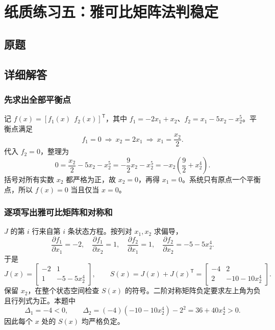 \chapter{纸质练习五：雅可比矩阵法判稳定}

\section{原题}



\section{详细解答}

\subsection{先求出全部平衡点}

记 $f(x)=[f_1(x)\ \ f_2(x)]^{\mathsf T}$，其中
$f_1=-2x_1+x_2$、$f_2=x_1-5x_2-x_2^5$。平衡点满足
\[
    f_1=0 \ \Longrightarrow\ x_2=2x_1 \ \Longrightarrow\ x_1=\frac{x_2}{2}.
\]
代入 $f_2=0$，整理为
\[
    0=\frac{x_2}{2}-5x_2-x_2^5
      =-\frac92 x_2-x_2^5
      =-x_2\left(\frac92+x_2^4\right).
\]
括号对所有实数 $x_2$ 都严格为正，故 $x_2=0$，再得 $x_1=0$。系统只有原点一个平衡点，所以 $f(x)=0$ 当且仅当 $x=0$。

\subsection{逐项写出雅可比矩阵和对称和}

$J$ 的第 $i$ 行来自第 $i$ 条状态方程。按列对 $x_1,x_2$ 求偏导，
\[
    \frac{\partial f_1}{\partial x_1}=-2,\quad
    \frac{\partial f_1}{\partial x_2}=1,\quad
    \frac{\partial f_2}{\partial x_1}=1,\quad
    \frac{\partial f_2}{\partial x_2}=-5-5x_2^4 .
\]
于是
\[
    J(x)=\begin{bmatrix}-2&1\\1&-5-5x_2^4\end{bmatrix},\qquad
    S(x)=J(x)+J(x)^{\mathsf T}
        =\begin{bmatrix}-4&2\\2&-10-10x_2^4\end{bmatrix}.
\]
保留 $x_2$，在整个状态空间检查 $S(x)$ 的符号。二阶对称矩阵负定要求左上角为负且行列式为正。本题中
\[
    \Delta_1=-4<0,\qquad
    \Delta_2=(-4)(-10-10x_2^4)-2^2=36+40x_2^4>0 .
\]
因此每个 $x$ 处的 $S(x)$ 均严格负定。

